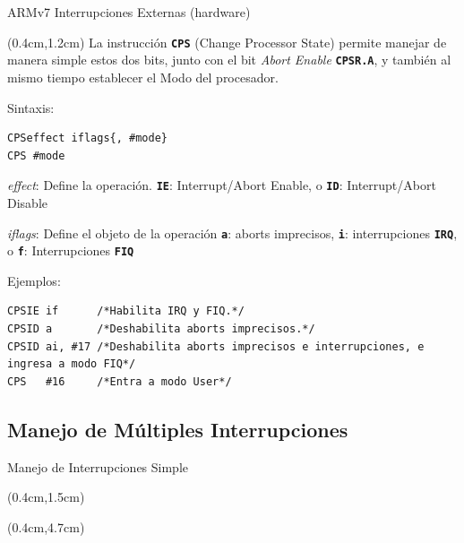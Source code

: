 \documentclass[table,x11names,aspectratio=169]{beamer}
\begin{document}
\begin{frame}[fragile]{ARMv7 Interrupciones Externas (hardware)}
 \begin{textblock*}{\textwidth}(0.4cm,1.2cm) \justifying
La instrucción \textbf{\texttt{CPS}} (Change Processor State) permite manejar de manera simple estos dos bits, junto con el bit \textit{Abort Enable} \textbf{\texttt{CPSR.A}}, y también al mismo tiempo establecer el Modo del procesador.

Sintaxis:\vspace{-0.3cm}
   \begin{lstlisting}[basicstyle=\scriptsize,escapechar=\@,numbers=none, frame=single, xleftmargin=20pt, xrightmargin=0pt,]
CPSeffect iflags{, #mode}
CPS #mode
   \end{lstlisting}
\vspace{-0.3cm} \textit{effect}:  Define la operación. \texttt{\textbf{IE}}: Interrupt/Abort Enable, o \texttt{\textbf{ID}}: Interrupt/Abort Disable

\textit{iflags}: Define el objeto de la operación \texttt{\textbf{a}}: aborts imprecisos, \texttt{\textbf{i}}: interrupciones \texttt{\textbf{IRQ}}, o \texttt{\textbf{f}}: Interrupciones \texttt{\textbf{FIQ}}

Ejemplos:\vspace{-0.3cm}
   \begin{lstlisting}[basicstyle=\scriptsize,escapechar=\@,numbers=none, frame=single, xleftmargin=20pt, xrightmargin=0pt,]
CPSIE if      /*Habilita IRQ y FIQ.*/
CPSID a       /*Deshabilita aborts imprecisos.*/
CPSID ai, #17 /*Deshabilita aborts imprecisos e interrupciones, e ingresa a modo FIQ*/
CPS   #16     /*Entra a modo User*/
   \end{lstlisting}
 \end{textblock*}
\end{frame}

\subsection{Manejo de Múltiples Interrupciones}
\begin{frame}{Manejo de Interrupciones Simple}
 \begin{textblock*}{\textwidth}(0.4cm,1.5cm) \justifying
{}
 \end{textblock*}
 \begin{textblock*}{\textwidth}(0.4cm,4.7cm) \justifying
{}
 \end{textblock*}
\end{frame}
\end{document}

